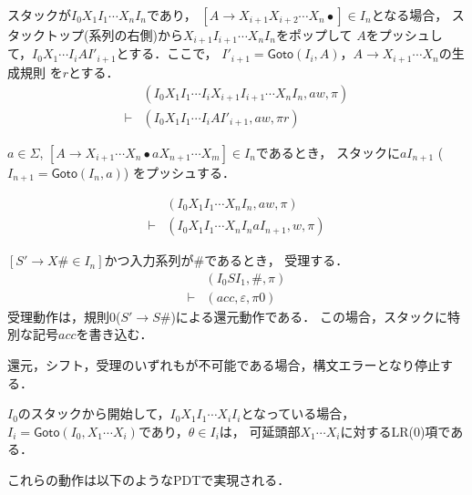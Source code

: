 \documentclass[dvipdfmx,a4j]{jbook}
\begin{document}
\begin{list}{}{}
  \item [{\bf 還元}]
  スタックが$I_0X_1I_1\cdots X_{n}I_n$であり，
$[A\rightarrow X_{i+1}X_{i+2}\cdots X_n\bullet]\in I_n$となる場合，
スタックトップ(系列の右側)から$X_{i+1}I_{i+1}\cdots X_nI_n$をポップして
$A$をプッシュして，$I_0X_1\cdots I_iAI'_{i+1}$とする．ここで，
$I'_{i+1}=\mathsf{Goto}(I_i,A)$，$A\rightarrow X_{i+1}\cdots X_n$の生成規則
を$r$とする．
\[\begin{array}{cl}
  & (I_0X_1I_1\cdots I_iX_{i+1}I_{i+1}\cdots X_nI_n,aw,\pi)\\
  \vdash & (I_0X_1I_1\cdots I_iAI'_{i+1},aw,\pi r)
\end{array}\]

  \item [{\bf シフト}]
  $a\in\Sigma$,
  $[A\rightarrow X_{i+1}\cdots X_n\bullet a X_{n+1}\cdots X_m]\in I_n$であるとき，
  スタックに$a I_{n+1}$ ($I_{n+1}=\mathsf{Goto}(I_n,a)$) をプッシュする．

  \[\begin{array}{cl}
      & (I_0X_1I_1\cdots X_nI_n,aw,\pi)\\
  \vdash & (I_0X_1I_1\cdots X_nI_n a I_{n+1},w,\pi)
  \end{array}
  \]
  \item [{\bf 受理}]
  $[S'\rightarrow X\texttt{\#}\in I_n]$かつ入力系列が$\texttt{\#}$であるとき，
  受理する．
  \[\begin{array}{cl}
    & (I_0SI_1,\texttt{\#},\pi)\\
  \vdash & (acc,\varepsilon,\pi 0)
  \end{array}\]
  受理動作は，規則0($S'\rightarrow S\texttt{\#}$)による還元動作である．
  この場合，スタックに特別な記号$acc$を書き込む．
  \item [{\bf エラー}]
  還元，シフト，受理のいずれもが不可能である場合，構文エラーとなり停止する．
\end{list}

$I_0$のスタックから開始して，$I_0X_1I_1\cdots X_iI_i$となっている場合，
$I_i=\mathsf{Goto}(I_0,X_1\cdots X_i)$であり，$\theta\in I_i$は，
可延頭部$X_1\cdots X_i$に対するLR(0)項である．

これらの動作は以下のようなPDTで実現される．
\end{document}
